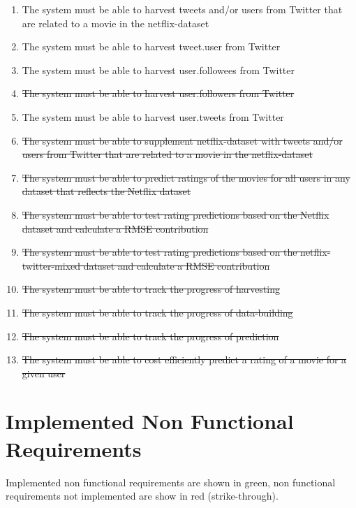 \begin{enumerate}[label=\bfseries FR \arabic*:]
  \item {\color{OliveGreen}The system must be able to harvest tweets and/or users from Twitter that are related to a movie in the netflix-dataset}
  \item {\color{OliveGreen}The system must be able to harvest tweet.user from Twitter}
  \item {\color{OliveGreen}The system must be able to harvest user.followees from Twitter}
  \item {\color{RedOrange}\st{The system must be able to harvest user.followers from Twitter}}
  \item {\color{OliveGreen}The system must be able to harvest user.tweets from Twitter}
  \item {\color{RedOrange}\st{The system must be able to supplement netflix-dataset with tweets and/or users from Twitter that are related to a movie in the netflix-dataset}}
  \item {\color{RedOrange}\st{The system must be able to predict ratings of the movies for all users in any dataset that reflects the Netflix dataset}}
  \item {\color{RedOrange}\st{The system must be able to test rating predictions based on the Netflix dataset and calculate a RMSE contribution}}
  \item {\color{RedOrange}\st{The system must be able to test rating predictions based on the netflix-twitter-mixed dataset and calculate a RMSE contribution}}
  \item {\color{RedOrange}\st{The system must be able to track the progress of harvesting}}
  \item {\color{RedOrange}\st{The system must be able to track the progress of data-building}}
  \item {\color{RedOrange}\st{The system must be able to track the progress of prediction}}
  \item {\color{RedOrange}\st{The system must be able to cost efficiently predict a rating of a movie for a given user}}
\end{enumerate}

\section{Implemented Non Functional Requirements}
Implemented non functional requirements are shown in green, non functional requirements not implemented are show in red (strike-through).


